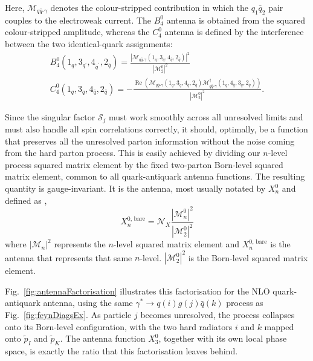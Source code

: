 Here, $\mathcal M_{q\bar q\text{-}\gamma}$ denotes the colour-stripped
contribution in which the $q_1\bar q_2$ pair couples to the electroweak
current. The $B_4^0$ antenna is obtained from the squared colour-stripped
amplitude, whereas the $C_4^0$ antenna is defined by the interference between
the two identical-quark assignments:
\begin{equation}
    \begin{gathered}
        B_4^0(1_q,3_{q^\prime}, 4_{\bar q^\prime},2_{\bar q}) = \frac{|\mathcal M_{q\bar q\text{-}\gamma}(1_q,3_q,4_{\bar q},2_{\bar q})|^2}{|\mathcal M_2^0|^2}\\
        C_4^0(1_q,3_q,4_{\bar q},2_{\bar q}) = -\frac{\operatorname{Re}\!\left(\mathcal M_{q\bar q\text{-}\gamma}(1_q,3_q,4_{\bar q},2_{\bar q})\mathcal M_{q\bar q\text{-}\gamma}^\dagger(1_q,4_{\bar q},3_{q},2_{\bar q})\right)}{|\mathcal M_2^0|^2}.
    \end{gathered}
\end{equation}

\iffalse

Since the singular factor $\mathcal S_j$ must work smoothly across all unresolved limits 
and must also handle all spin correlations correctly, it should, optimally, be 
a function that preserves all the unresolved parton information without the noise 
coming from the hard parton process. This is easily achieved by dividing our
$n$-level process squared matrix element by the fixed two-parton Born-level squared
matrix element, common to all quark-antiquark antenna functions.
The resulting quantity is gauge-invariant. It is the antenna, most usually 
notated by $X_{n}^0$ and defined as \cite{Gehrmann-DeRidder:2005btv,Kosower:1997zr, Campbell:1998nn},
\begin{equation}\label{eq:antennaTree}
    X_{n}^{0\text{, bare}}=\mathcal N_X\frac{\left|\mathcal M_{n}^0\right|^2}{\left|\mathcal M_2^0\right|^2}
\end{equation}
where $|\mathcal M_n|^2$ represents the $n$-level squared matrix element and
$X_{n}^{0\text{, bare}}$ is the antenna that represents that same $n$-level.
$\left|\mathcal M_2^0\right|^2$ is the Born-level squared matrix element.

Fig.~\ref{fig:antennaFactorisation} illustrates this factorisation for the
NLO quark-antiquark antenna, using the same $\gamma^*\to q(i)g(j)\bar q(k)$
process as Fig.~\ref{fig:feynDiagsEx}. As particle $j$ becomes unresolved, the
process collapses onto its Born-level configuration, with the two hard radiators
$i$ and $k$ mapped onto $\tilde p_I$ and $\tilde p_K$. The antenna function
$X_{3}^0$, together with its own local phase space, is exactly the ratio that
this factorisation leaves behind.

